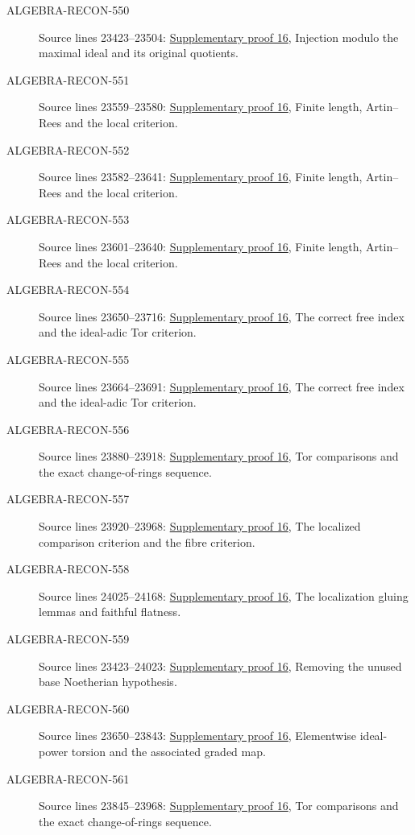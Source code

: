 \begin{description}
\item[ALGEBRA-RECON-550] Source lines 23423--23504: \hyperlink{algebra_flatness_criteria_notes_20260928}{Supplementary proof 16}, Injection modulo the maximal ideal and its original quotients.
\item[ALGEBRA-RECON-551] Source lines 23559--23580: \hyperlink{algebra_flatness_criteria_notes_20260928}{Supplementary proof 16}, Finite length, Artin--Rees and the local criterion.
\item[ALGEBRA-RECON-552] Source lines 23582--23641: \hyperlink{algebra_flatness_criteria_notes_20260928}{Supplementary proof 16}, Finite length, Artin--Rees and the local criterion.
\item[ALGEBRA-RECON-553] Source lines 23601--23640: \hyperlink{algebra_flatness_criteria_notes_20260928}{Supplementary proof 16}, Finite length, Artin--Rees and the local criterion.
\item[ALGEBRA-RECON-554] Source lines 23650--23716: \hyperlink{algebra_flatness_criteria_notes_20260928}{Supplementary proof 16}, The correct free index and the ideal-adic Tor criterion.
\item[ALGEBRA-RECON-555] Source lines 23664--23691: \hyperlink{algebra_flatness_criteria_notes_20260928}{Supplementary proof 16}, The correct free index and the ideal-adic Tor criterion.
\item[ALGEBRA-RECON-556] Source lines 23880--23918: \hyperlink{algebra_flatness_criteria_notes_20260928}{Supplementary proof 16}, Tor comparisons and the exact change-of-rings sequence.
\item[ALGEBRA-RECON-557] Source lines 23920--23968: \hyperlink{algebra_flatness_criteria_notes_20260928}{Supplementary proof 16}, The localized comparison criterion and the fibre criterion.
\item[ALGEBRA-RECON-558] Source lines 24025--24168: \hyperlink{algebra_flatness_criteria_notes_20260928}{Supplementary proof 16}, The localization gluing lemmas and faithful flatness.
\item[ALGEBRA-RECON-559] Source lines 23423--24023: \hyperlink{algebra_flatness_criteria_notes_20260928}{Supplementary proof 16}, Removing the unused base Noetherian hypothesis.
\item[ALGEBRA-RECON-560] Source lines 23650--23843: \hyperlink{algebra_flatness_criteria_notes_20260928}{Supplementary proof 16}, Elementwise ideal-power torsion and the associated graded map.
\item[ALGEBRA-RECON-561] Source lines 23845--23968: \hyperlink{algebra_flatness_criteria_notes_20260928}{Supplementary proof 16}, Tor comparisons and the exact change-of-rings sequence.
\end{description}

